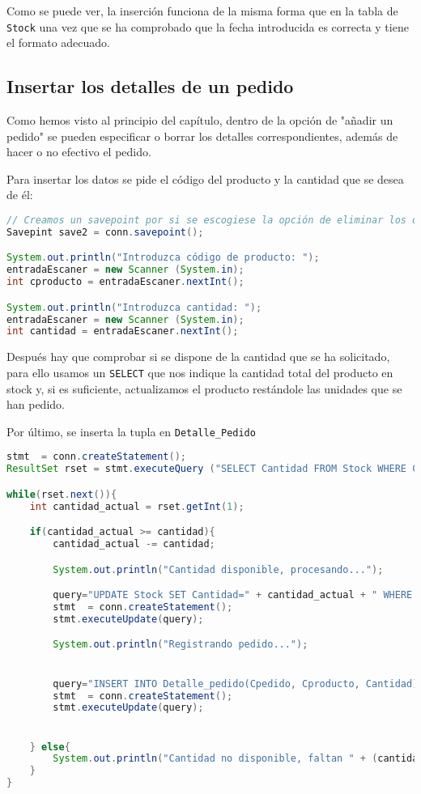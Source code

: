 Como se puede ver, la inserción funciona de la misma forma que en la tabla de \texttt{Stock} una vez que se ha comprobado que la fecha introducida es correcta y tiene el formato adecuado.

\pagebreak
\subsection{Insertar los detalles de un pedido}
Como hemos visto al principio del capítulo, dentro de la opción de "añadir un pedido" se pueden especificar o borrar los detalles correspondientes, además de hacer o no efectivo el pedido.

Para insertar los datos se pide el código del producto y la cantidad que se desea de él:

\begin{lstlisting}[language=Java]
// Creamos un savepoint por si se escogiese la opción de eliminar los detalles del pedido
Savepint save2 = conn.savepoint();

System.out.println("Introduzca código de producto: ");
entradaEscaner = new Scanner (System.in);
int cproducto = entradaEscaner.nextInt();

System.out.println("Introduzca cantidad: ");
entradaEscaner = new Scanner (System.in);
int cantidad = entradaEscaner.nextInt();

\end{lstlisting}

Después hay que comprobar si se dispone de la cantidad que se ha solicitado, para ello usamos un \texttt{SELECT} que nos indique la cantidad total del producto en stock y, si es suficiente, actualizamos el producto restándole las unidades que se han pedido.

Por último, se inserta la tupla en \texttt{Detalle\_Pedido}

\begin{lstlisting}[language=Java]
stmt  = conn.createStatement();
ResultSet rset = stmt.executeQuery ("SELECT Cantidad FROM Stock WHERE Cproducto='" + cproducto + "'");

while(rset.next()){
	int cantidad_actual = rset.getInt(1);

	if(cantidad_actual >= cantidad){
		cantidad_actual -= cantidad;

		System.out.println("Cantidad disponible, procesando...");

		query="UPDATE Stock SET Cantidad=" + cantidad_actual + " WHERE Cproducto='" + cproducto + "'";
		stmt  = conn.createStatement();
		stmt.executeUpdate(query);

		System.out.println("Registrando pedido...");


		query="INSERT INTO Detalle_pedido(Cpedido, Cproducto, Cantidad) VALUES ((SELECT CPedido FROM Pedido WHERE Cpedido='" + cpedido + "'), (SELECT Cproducto FROM Stock WHERE Cproducto='" + cproducto + "')," + cantidad + ")";
		stmt  = conn.createStatement();
		stmt.executeUpdate(query);


	} else{
		System.out.println("Cantidad no disponible, faltan " + (cantidad-cantidad_actual) + " unidades");
	}
}
\end{lstlisting}

